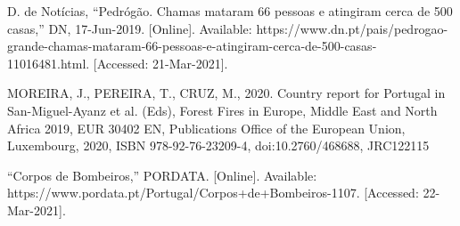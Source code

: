 \documentclass[a4paper,12pt]{scrreprt}
\begin{document}
\renewcommand\bibname{Referências}

\begin{thebibliography}{9}

D. de Notícias, “Pedrógão. Chamas mataram 66 pessoas e atingiram cerca de 500 casas,” DN, 17-Jun-2019. [Online]. Available: https://www.dn.pt/pais/pedrogao-grande-chamas-mataram-66-pessoas-e-atingiram-cerca-de-500-casas-11016481.html. [Accessed: 21-Mar-2021]. 

MOREIRA, J., PEREIRA, T., CRUZ, M., 2020. Country report for Portugal in San-Miguel-Ayanz et al. (Eds), Forest Fires in Europe, Middle East and North Africa 2019, EUR 30402 EN, Publications Office of the European Union, Luxembourg, 2020, ISBN 978-92-76-23209-4, doi:10.2760/468688, JRC122115

“Corpos de Bombeiros,” PORDATA. [Online]. Available: https://www.pordata.pt/Portugal/Corpos+de+Bombeiros-1107. [Accessed: 22-Mar-2021]. 

\end{thebibliography}




\renewcommand{\nomname}{Lista de Siglas e Acrónimos}

\renewcommand{\nompreamble}{}



\printnomenclature



\end{document}
